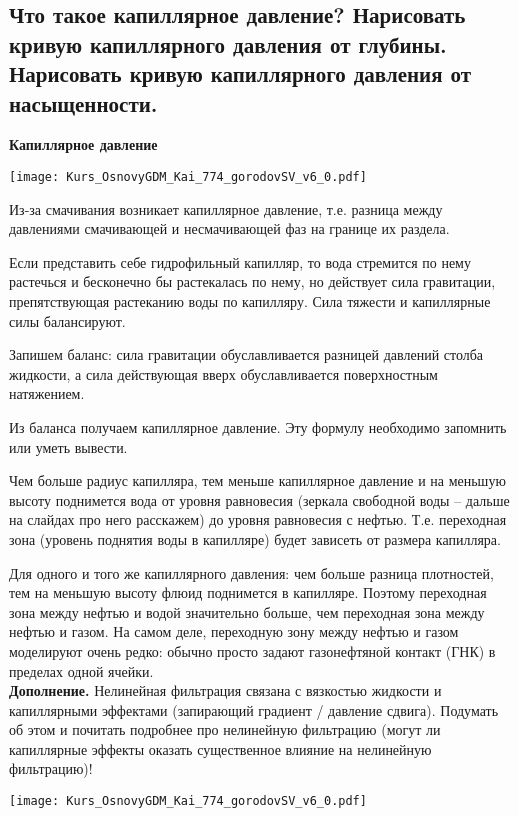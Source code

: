 

\subsection{Что такое капиллярное давление? Нарисовать кривую капиллярного давления от глубины. Нарисовать кривую капиллярного давления от насыщенности.}

\textbf{Капиллярное давление}

\texttt{[image: Kurs\_OsnovyGDM\_Kai\_774\_gorodovSV\_v6\_0.pdf]}

Из-за смачивания возникает капиллярное давление, т.е. разница между давлениями смачивающей и несмачивающей фаз на границе их раздела.

Если представить себе гидрофильный капилляр, то вода стремится по нему растечься и бесконечно бы растекалась по нему, но действует сила гравитации, препятствующая растеканию воды по капилляру.
Сила тяжести и капиллярные силы балансируют.

Запишем баланс: сила гравитации обуславливается разницей давлений столба жидкости, а сила действующая вверх обуславливается поверхностным натяжением.

Из баланса получаем капиллярное давление. Эту формулу необходимо запомнить или уметь вывести.

Чем больше радиус капилляра, тем меньше капиллярное давление и на меньшую высоту поднимется вода от уровня равновесия (зеркала свободной воды -- дальше на слайдах про него расскажем) до уровня равновесия с нефтью. Т.е. переходная зона (уровень поднятия воды в капилляре) будет зависеть от размера капилляра.

Для одного и того же капиллярного давления: чем больше разница плотностей, тем на меньшую высоту флюид поднимется в капилляре.
Поэтому переходная зона между нефтью и водой значительно больше, чем переходная зона между нефтью и газом.
На самом деле, переходную зону между нефтью и газом моделируют очень редко: обычно просто задают газонефтяной контакт (ГНК) в пределах одной ячейки.
\\

\textbf{Дополнение.}
Нелинейная фильтрация связана с вязкостью жидкости и капиллярными эффектами (запирающий градиент / давление сдвига). Подумать об этом и почитать подробнее про нелинейную фильтрацию (могут ли капиллярные эффекты оказать существенное влияние на нелинейную фильтрацию)!

\texttt{[image: Kurs\_OsnovyGDM\_Kai\_774\_gorodovSV\_v6\_0.pdf]}

